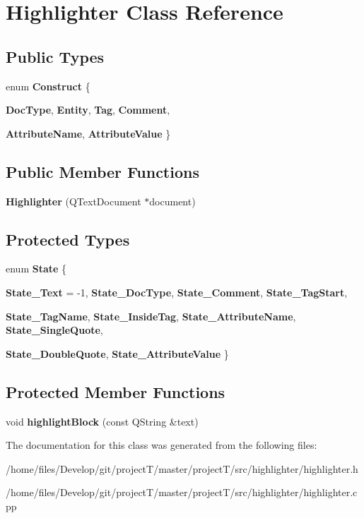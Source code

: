 \hypertarget{classHighlighter}{
\section{Highlighter Class Reference}
\label{classHighlighter}
}
\subsection*{Public Types}
\begin{DoxyCompactItemize}
\item 
enum {\bfseries Construct} \{ \par
{\bfseries DocType}, 
{\bfseries Entity}, 
{\bfseries Tag}, 
{\bfseries Comment}, 
\par
{\bfseries AttributeName}, 
{\bfseries AttributeValue}
 \}
\end{DoxyCompactItemize}
\subsection*{Public Member Functions}
\begin{DoxyCompactItemize}
\item 
\hypertarget{classHighlighter_a759dcdf46928579de5921f039291b8aa}{
{\bfseries Highlighter} (QTextDocument $\ast$document)}
\label{classHighlighter_a759dcdf46928579de5921f039291b8aa}

\end{DoxyCompactItemize}
\subsection*{Protected Types}
\begin{DoxyCompactItemize}
\item 
enum {\bfseries State} \{ \par
{\bfseries State\_\-Text} =  -\/1, 
{\bfseries State\_\-DocType}, 
{\bfseries State\_\-Comment}, 
{\bfseries State\_\-TagStart}, 
\par
{\bfseries State\_\-TagName}, 
{\bfseries State\_\-InsideTag}, 
{\bfseries State\_\-AttributeName}, 
{\bfseries State\_\-SingleQuote}, 
\par
{\bfseries State\_\-DoubleQuote}, 
{\bfseries State\_\-AttributeValue}
 \}
\end{DoxyCompactItemize}
\subsection*{Protected Member Functions}
\begin{DoxyCompactItemize}
\item 
\hypertarget{classHighlighter_ad07c7fd55d2ce2c675bca607b9370488}{
void {\bfseries highlightBlock} (const QString \&text)}
\label{classHighlighter_ad07c7fd55d2ce2c675bca607b9370488}

\end{DoxyCompactItemize}


The documentation for this class was generated from the following files:\begin{DoxyCompactItemize}
\item 
/home/files/Develop/git/projectT/master/projectT/src/highlighter/highlighter.h\item 
/home/files/Develop/git/projectT/master/projectT/src/highlighter/highlighter.cpp\end{DoxyCompactItemize}
